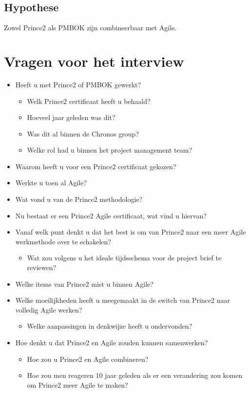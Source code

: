 \documentclass[]{article}
\begin{document}
\subsection{Hypothese}
Zowel Prince2 als PMBOK zijn combineerbaar met Agile.

\section{Vragen voor het interview}
\begin{itemize}
	\item Heeft u met Prince2 of PMBOK gewerkt?
	\begin{itemize}
		\item Welk Prince2 certificaat heeft u behaald?
		\item Hoeveel jaar geleden was dit?
		\item Was dit al binnen de Chronos group?
		\item Welke rol had u binnen het project management team?
	\end{itemize}
	\item Waarom heeft u voor een Prince2 certificaat gekozen?
	\item Werkte u toen al Agile?
	\item Wat vond u van de Prince2 methodologie?
	\item Nu bestaat er een Prince2 Agile certificaat, wat vind u hiervan?
	\item Vanaf welk punt denkt u dat het best is om van Prince2 naar een meer Agile werkmethode over te schakelen?
	\begin{itemize}
		\item Wat zou volgens u het ideale tijdsschema voor de project brief te reviewen?
	\end{itemize}
	\item Welke items van Prince2 mist u binnen Agile?
	\item Welke moeilijkheden heeft u meegemaakt in de switch van Prince2 naar volledig Agile werken?
	\begin{itemize}
		\item Welke aanpassingen in denkwijze heeft u ondervonden?
	\end{itemize}
	\item Hoe denkt u dat Prince2 en Agile zouden kunnen samenwerken?
	\begin{itemize}
		\item Hoe zou u Prince2 en Agile combineren?
		\item Hoe zou men reageren 10 jaar geleden als er een verandering zou komen om Prince2 meer Agile te maken?
	\end{itemize}
\end{itemize}
\end{document}
